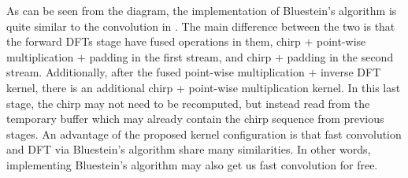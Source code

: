 \documentclass[11pt]{scrartcl}
\begin{document}
As can be seen from the diagram, the implementation of Bluestein's algorithm is quite similar to the convolution in . The main difference between the two is that the forward DFTs stage have fused operations in them, chirp + point-wise multiplication + padding in the first stream, and chirp + padding in the second stream. Additionally, after the fused point-wise multiplication + inverse DFT kernel, there is an additional chirp + point-wise multiplication kernel. In this last stage, the chirp may not need to be recomputed, but instead read from the temporary buffer which may already contain the chirp sequence from previous stages. An advantage of the proposed kernel configuration is that fast convolution and DFT via Bluestein's algorithm share many similarities. In other words, implementing Bluestein's algorithm may also get us fast convolution for free.
\end{document}
